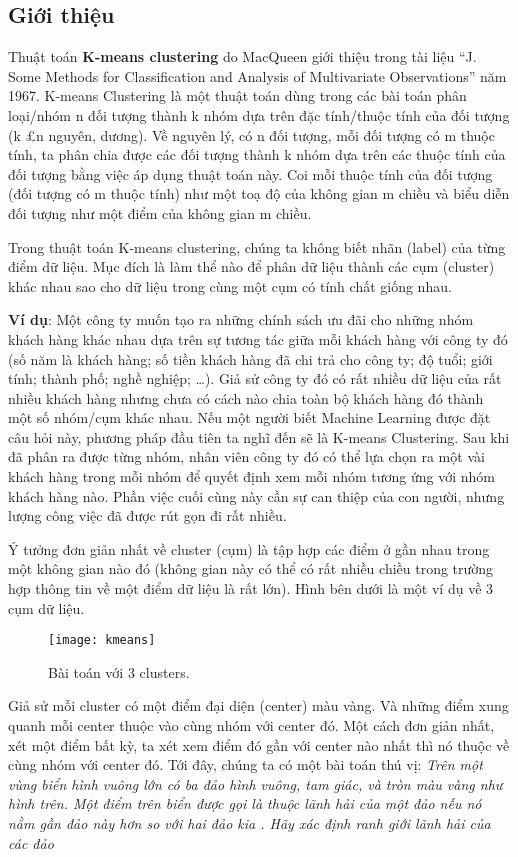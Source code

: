 \subsection{Giới thiệu}
Thuật toán \textbf{K-means clustering} do MacQueen giới thiệu trong tài liệu “J. Some Methods for Classification and Analysis of Multivariate Observations” năm 1967.
K-means Clustering là một thuật toán dùng trong các bài toán phân loại/nhóm n đối tượng thành k nhóm dựa trên đặc tính/thuộc tính của đối tượng (k £n nguyên, dương).
Về nguyên lý, có n đối tượng, mỗi đối tượng có m thuộc tính, ta phân chia được các đối tượng thành k nhóm dựa trên các thuộc tính của đối tượng bằng việc áp dụng thuật toán này.
Coi mỗi thuộc tính của đối tượng (đối tượng có m thuộc tính) như một toạ độ của không gian m chiều và biểu diễn đối tượng như một điểm của không gian m chiều. 
\par
Trong thuật toán K-means clustering, chúng ta không biết nhãn (label) của từng điểm dữ liệu. 
Mục đích là làm thể nào để phân dữ liệu thành các cụm (cluster) khác nhau sao cho dữ liệu trong cùng một cụm có tính chất giống nhau.
\par
\textbf{Ví dụ}: Một công ty muốn tạo ra những chính sách ưu đãi cho những nhóm khách hàng khác nhau dựa trên sự tương tác giữa mỗi khách hàng với công ty đó (số năm là khách hàng; số tiền khách hàng đã chi trả cho công ty; độ tuổi; giới tính; thành phố; nghề nghiệp; …). 
Giả sử công ty đó có rất nhiều dữ liệu của rất nhiều khách hàng nhưng chưa có cách nào chia toàn bộ khách hàng đó thành một số nhóm/cụm khác nhau. 
Nếu một người biết Machine Learning được đặt câu hỏi này, phương pháp đầu tiên ta nghĩ đến sẽ là K-means Clustering. 
Sau khi đã phân ra được từng nhóm, nhân viên công ty đó có thể lựa chọn ra một vài khách hàng trong mỗi nhóm để quyết định xem mỗi nhóm tương ứng với nhóm khách hàng nào. 
Phần việc cuối cùng này cần sự can thiệp của con người, nhưng lượng công việc đã được rút gọn đi rất nhiều.
\par
Ý tưởng đơn giản nhất về cluster (cụm) là tập hợp các điểm ở gần nhau trong một không gian nào đó (không gian này có thể có rất nhiều chiều trong trường hợp thông tin về một điểm dữ liệu là rất lớn). 
Hình bên dưới là một ví dụ về 3 cụm dữ liệu.
\begin{figure}[!htbp]
    \centering
    \texttt{[image: kmeans]}
    \caption{Bài toán với 3 clusters.}
    \label{fig:x cubed graph}
\end{figure}
\FloatBarrier
Giả sử mỗi cluster có một điểm đại diện (center) màu vàng. Và những điểm xung quanh mỗi center thuộc vào cùng nhóm với center đó. Một cách đơn giản nhất, xét một điểm bất kỳ, ta xét xem điểm đó gần với center nào nhất thì nó thuộc về cùng nhóm với center đó. Tới đây, chúng ta có một bài toán thú vị: \textit{Trên một vùng biển hình vuông lớn có ba đảo hình vuông, tam giác, và tròn màu vàng như hình trên. Một điểm trên biển được gọi là thuộc lãnh hải của một đảo nếu nó nằm gần đảo này hơn so với hai đảo kia . Hãy xác định ranh giới lãnh hải của các đảo}
